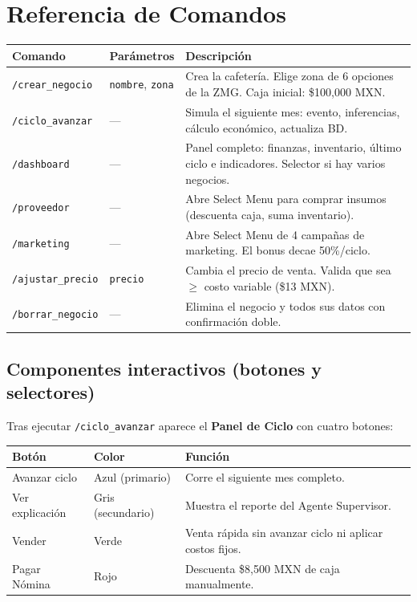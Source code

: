 \documentclass[12pt, a4paper]{article}
\begin{document}
\section{Referencia de Comandos}

\begin{center}
\begin{tabularx}{\linewidth}{llX}
  \toprule
  \textbf{Comando} & \textbf{Parámetros} & \textbf{Descripción} \\
  \midrule
  \texttt{/crear\_negocio} & \texttt{nombre}, \texttt{zona} &
    Crea la cafetería. Elige zona de 6 opciones de la ZMG. Caja inicial: \$100{,}000 MXN. \\
  \addlinespace
  \texttt{/ciclo\_avanzar} & --- &
    Simula el siguiente mes: evento, inferencias, cálculo económico, actualiza BD. \\
  \addlinespace
  \texttt{/dashboard} & --- &
    Panel completo: finanzas, inventario, último ciclo e indicadores. Selector si hay varios negocios. \\
  \addlinespace
  \texttt{/proveedor} & --- &
    Abre Select Menu para comprar insumos (descuenta caja, suma inventario). \\
  \addlinespace
  \texttt{/marketing} & --- &
    Abre Select Menu de 4 campañas de marketing. El bonus decae 50\%/ciclo. \\
  \addlinespace
  \texttt{/ajustar\_precio} & \texttt{precio} &
    Cambia el precio de venta. Valida que sea $\geq$ costo variable (\$13 MXN). \\
  \addlinespace
  \texttt{/borrar\_negocio} & --- &
    Elimina el negocio y todos sus datos con confirmación doble. \\
  \bottomrule
\end{tabularx}
\end{center}

\subsection{Componentes interactivos (botones y selectores)}

Tras ejecutar \texttt{/ciclo\_avanzar} aparece el \textbf{Panel de Ciclo}
con cuatro botones:

\begin{center}
\begin{tabular}{lll}
  \toprule
  \textbf{Botón} & \textbf{Color} & \textbf{Función} \\
  \midrule
  Avanzar ciclo   & Azul (primario) & Corre el siguiente mes completo. \\
  Ver explicación & Gris (secundario) & Muestra el reporte del Agente Supervisor. \\
  Vender          & Verde & Venta rápida sin avanzar ciclo ni aplicar costos fijos. \\
  Pagar Nómina    & Rojo & Descuenta \$8{,}500 MXN de caja manualmente. \\
  \bottomrule
\end{tabular}
\end{center}
\end{document}
